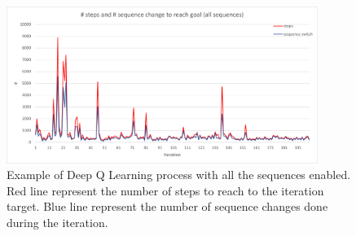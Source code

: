         \begin{figure}
            \centering
            \includegraphics[width=0.9\textwidth]{images/ALL_SEQ_QLEARN.png}
            \caption{Example of Deep Q Learning process with all the sequences enabled. Red line represent the number of steps to reach to the iteration target. Blue line represent the number of sequence changes done during the iteration.}
            \label{fig:all_sequences}
        \end{figure}
        